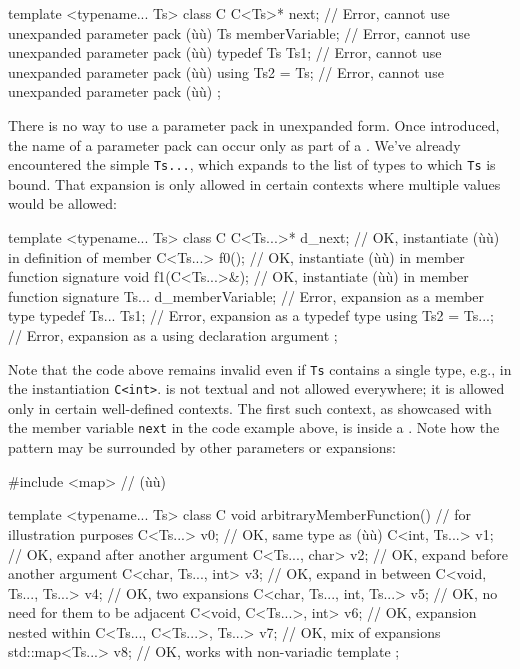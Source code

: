 \begin{emcppslisting}
template <typename... Ts>
class C
{
    C<Ts>* next;        // Error, cannot use unexpanded parameter pack (ù{}ù)
    Ts memberVariable;  // Error, cannot use unexpanded parameter pack (ù{}ù)
    typedef Ts Ts1;     // Error, cannot use unexpanded parameter pack (ù{}ù)
    using Ts2 = Ts;     // Error, cannot use unexpanded parameter pack (ù{}ù)
};
\end{emcppslisting}
    

\noindent There is no way to use a parameter pack in unexpanded form. Once
introduced, the name of a parameter pack can occur only as part of a
. We've already encountered the simple
 \lstinline!Ts...!, which expands to the list of
types to which \lstinline!Ts! is bound. That expansion is only allowed in
certain contexts where multiple values would be allowed:

\begin{emcppslisting}
template <typename... Ts>
class C
{
    C<Ts...>* d_next;        // OK, instantiate (ù{}ù) in definition of member
    C<Ts...> f0();           // OK, instantiate (ù{}ù) in member function signature
    void f1(C<Ts...>&);      // OK, instantiate (ù{}ù) in member function signature
    Ts... d_memberVariable;  // Error, expansion as a member type
    typedef Ts... Ts1;       // Error, expansion as a typedef type
    using Ts2 = Ts...;       // Error, expansion as a using declaration argument
};
\end{emcppslisting}
    

\noindent Note that the code above remains invalid even if \lstinline!Ts! contains a
single type, e.g., in the instantiation \lstinline!C<int>!.  is not textual and not allowed everywhere; it is allowed only
in certain well-defined contexts. The first such context, as showcased
with the member variable \lstinline!next! in the code example above, is
inside a . Note how the pattern may be
surrounded by other parameters or expansions:

\begin{emcppslisting}
#include <map>  // (ù{}ù)

template <typename... Ts>
class C
{
    void arbitraryMemberFunction()      // for illustration purposes
    {
        C<Ts...>                   v0;  // OK, same type as (ù{}ù)
        C<int, Ts...>              v1;  // OK, expand after another argument
        C<Ts..., char>             v2;  // OK, expand before another argument
        C<char, Ts..., int>        v3;  // OK, expand in between
        C<void, Ts..., Ts...>      v4;  // OK, two expansions
        C<char, Ts..., int, Ts...> v5;  // OK, no need for them to be adjacent
        C<void, C<Ts...>, int>     v6;  // OK, expansion nested within
        C<Ts..., C<Ts...>, Ts...>  v7;  // OK, mix of expansions
        std::map<Ts...>            v8;  // OK, works with non-variadic template
    }
};
\end{emcppslisting}
    


